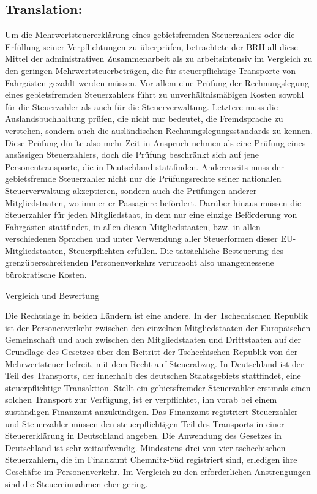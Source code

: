 \documentclass[10pt]{article}
\begin{document}
\subsection*{Translation:}

Um die Mehrwertsteuererklärung eines gebietsfremden Steuerzahlers oder die Erfüllung seiner Verpflichtungen zu überprüfen, betrachtete der BRH all diese Mittel der administrativen Zusammenarbeit als zu arbeitsintensiv im Vergleich zu den geringen Mehrwertsteuerbeträgen, die für steuerpflichtige Transporte von Fahrgästen gezahlt werden müssen.
Vor allem eine Prüfung der Rechnungslegung eines gebietsfremden Steuerzahlers führt zu unverhältnismäßigen Kosten sowohl für die Steuerzahler als auch für die Steuerverwaltung.
Letztere muss die Auslandsbuchhaltung prüfen, die nicht nur bedeutet, die Fremdsprache zu verstehen, sondern auch die ausländischen Rechnungslegungsstandards zu kennen.
Diese Prüfung dürfte also mehr Zeit in Anspruch nehmen als eine Prüfung eines ansässigen Steuerzahlers, doch die Prüfung beschränkt sich auf jene Personentransporte, die in Deutschland stattfinden.
Andererseits muss der gebietsfremde Steuerzahler nicht nur die Prüfungsrechte seiner nationalen Steuerverwaltung akzeptieren, sondern auch die Prüfungen anderer Mitgliedstaaten, wo immer er Passagiere befördert.
Darüber hinaus müssen die Steuerzahler für jeden Mitgliedstaat, in dem nur eine einzige Beförderung von Fahrgästen stattfindet, in allen diesen Mitgliedstaaten, bzw. in allen verschiedenen Sprachen und unter Verwendung aller Steuerformen dieser EU-Mitgliedstaaten, Steuerpflichten erfüllen.
Die tatsächliche Besteuerung des grenzüberschreitenden Personenverkehrs verursacht also unangemessene bürokratische Kosten.


Vergleich und Bewertung

Die Rechtslage in beiden Ländern ist eine andere.
In der Tschechischen Republik ist der Personenverkehr zwischen den einzelnen Mitgliedstaaten der Europäischen Gemeinschaft und auch zwischen den Mitgliedstaaten und Drittstaaten auf der Grundlage des Gesetzes über den Beitritt der Tschechischen Republik von der Mehrwertsteuer befreit, mit dem Recht auf Steuerabzug.
In Deutschland ist der Teil des Transports, der innerhalb des deutschen Staatsgebiets stattfindet, eine steuerpflichtige Transaktion.
Stellt ein gebietsfremder Steuerzahler erstmals einen solchen Transport zur Verfügung, ist er verpflichtet, ihn vorab bei einem zuständigen Finanzamt anzukündigen.
Das Finanzamt registriert Steuerzahler und Steuerzahler müssen den steuerpflichtigen Teil des Transports in einer Steuererklärung in Deutschland angeben.
Die Anwendung des Gesetzes in Deutschland ist sehr zeitaufwendig.
Mindestens drei von vier tschechischen Steuerzahlern, die im Finanzamt Chemnitz-Süd registriert sind, erledigen ihre Geschäfte im Personenverkehr.
Im Vergleich zu den erforderlichen Anstrengungen sind die Steuereinnahmen eher gering.
\end{document}
